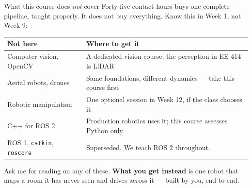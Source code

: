 \documentclass[aspectratio=169]{beamer}
\begin{document}
\begin{frame}{What this course does \emph{not} cover}
  \small
  Forty-five contact hours buys one complete pipeline, taught properly. It does not buy
  everything. Know this in Week 1, not Week 9:

  \vspace{0.5em}
  \begin{center}
  \begin{tabular}{@{}p{3.6cm}p{7.1cm}@{}}
    \toprule
    \textbf{Not here} & \textbf{Where to get it} \\
    \midrule
    Computer vision, OpenCV & A dedicated vision course; the perception in EE 414 is LiDAR \\[0.25em]
    Aerial robots, drones & Same foundations, different dynamics --- take this course first \\[0.25em]
    Robotic manipulation & One optional session in Week 12, if the class chooses it \\[0.25em]
    C++ for ROS 2 & Production robotics uses it; this course assesses Python only \\[0.25em]
    ROS 1, \texttt{catkin}, \texttt{roscore} & Superseded. We teach ROS 2 throughout. \\
    \bottomrule
  \end{tabular}
  \end{center}

  \vspace{0.4em}
  \footnotesize
  Ask me for reading on any of these. \textbf{What you get instead} is one robot that maps a
  room it has never seen and drives across it --- built by you, end to end.
\end{frame}
\end{document}
